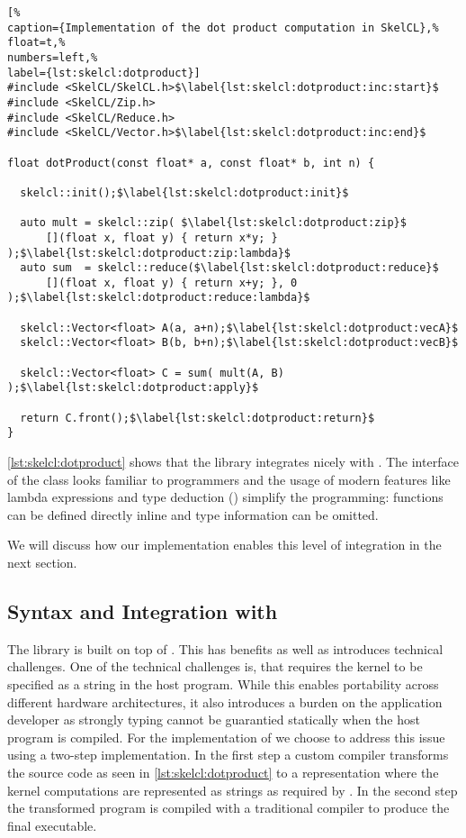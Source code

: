 \begin{lstlisting}[%                                                             
caption={Implementation of the dot product computation in SkelCL},%
float=t,%
numbers=left,%
label={lst:skelcl:dotproduct}]
#include <SkelCL/SkelCL.h>$\label{lst:skelcl:dotproduct:inc:start}$
#include <SkelCL/Zip.h>
#include <SkelCL/Reduce.h>
#include <SkelCL/Vector.h>$\label{lst:skelcl:dotproduct:inc:end}$

float dotProduct(const float* a, const float* b, int n) {

  skelcl::init();$\label{lst:skelcl:dotproduct:init}$

  auto mult = skelcl::zip( $\label{lst:skelcl:dotproduct:zip}$
      [](float x, float y) { return x*y; } );$\label{lst:skelcl:dotproduct:zip:lambda}$
  auto sum  = skelcl::reduce($\label{lst:skelcl:dotproduct:reduce}$
      [](float x, float y) { return x+y; }, 0 );$\label{lst:skelcl:dotproduct:reduce:lambda}$

  skelcl::Vector<float> A(a, a+n);$\label{lst:skelcl:dotproduct:vecA}$
  skelcl::Vector<float> B(b, b+n);$\label{lst:skelcl:dotproduct:vecB}$

  skelcl::Vector<float> C = sum( mult(A, B) );$\label{lst:skelcl:dotproduct:apply}$

  return C.front();$\label{lst:skelcl:dotproduct:return}$
}
\end{lstlisting}

\autoref{lst:skelcl:dotproduct} shows that the \SkelCL library integrates nicely with \Cpp.
The interface of the  class looks familiar to \Cpp programmers and the usage of modern \Cpp features like lambda expressions and type deduction () simplify the programming:
functions can be defined directly inline and type information can be omitted.

We will discuss how our implementation enables this level of integration in the next section.


\subsection{Syntax and Integration with \Cpp}
\label{section:skelcl-library:syntax}

The \SkelCL library is built on top of \OpenCL.
This has benefits as well as introduces technical challenges.
One of the technical challenges is, that \OpenCL requires the kernel to be specified as a string in the host program.
While this enables portability across different hardware architectures, it also introduces a burden on the application developer as strongly typing cannot be guarantied statically when the host program is compiled.
For the implementation of \SkelCL we choose to address this issue using a two-step implementation.
In the first step a custom compiler transforms the source code as seen in \autoref{lst:skelcl:dotproduct} to a representation where the kernel computations are represented as strings as required by \OpenCL.
In the second step the transformed program is compiled with a traditional \Cpp compiler to produce the final executable.

